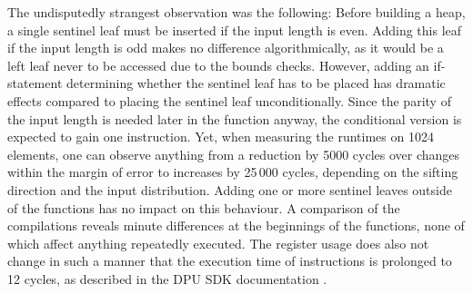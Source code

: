 The undisputedly strangest observation was the following:
Before building a heap, a single sentinel leaf must be inserted if the input length is even.
Adding this leaf if the input length is odd makes no difference algorithmically, as it would be a left leaf never to be accessed due to the bounds checks.
However, adding an if-statement determining whether the sentinel leaf has to be placed has dramatic effects compared to placing the sentinel leaf unconditionally.
Since the parity of the input length is needed later in the function anyway, the conditional version is expected to gain one instruction.
Yet, when measuring the runtimes on 1024 elements, one can observe anything from a reduction by 5000 cycles over changes within the margin of error to increases by 25\,000 cycles, depending on the sifting direction and the input distribution.
Adding one or more sentinel leaves outside of the \HS{} functions has no impact on this behaviour.
A comparison of the compilations reveals minute differences at the beginnings of the \HS{} functions, none of which affect anything repeatedly executed.
The register usage does also not change in such a manner that the execution time of instructions is prolonged to 12 cycles, as described in the DPU SDK documentation \cite[Instruction Set Architecture -- Efficient scheduling]{upmemSDK}.

